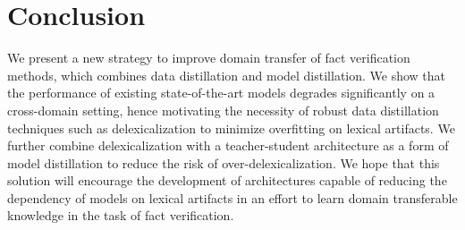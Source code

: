 \section{Conclusion}
We present a new strategy to improve domain transfer of fact verification methods, which combines data distillation and model distillation.  We show that the performance of existing state-of-the-art models degrades significantly on a cross-domain setting,
hence motivating the
necessity of robust data distillation techniques such as delexicalization to minimize overfitting on lexical artifacts.
We further combine delexicalization with a teacher-student architecture as a form of model distillation to reduce the risk of over-delexicalization. We hope that this solution will encourage the development of architectures capable of reducing the dependency of models on lexical artifacts in an effort to learn domain transferable knowledge in the task
of fact verification.










